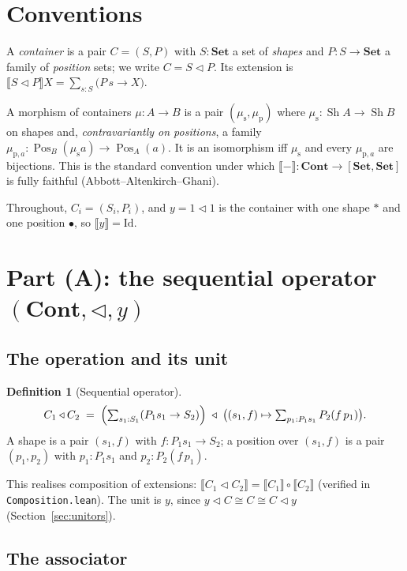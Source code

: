 \documentclass[11pt]{article}
\theoremstyle{definition}
\newtheorem{definition}{Definition}
\newcommand{\Set}{\mathbf{Set}}
\newcommand{\Cont}{\mathbf{Cont}}
\newcommand{\ext}[1]{\llbracket #1 \rrbracket}
\newcommand{\tri}{\mathbin{\triangleleft}}
\DeclareMathOperator{\Sh}{Sh}
\DeclareMathOperator{\Pos}{Pos}
\begin{document}
\section{Conventions}

A \emph{container} is a pair $C=(S,P)$ with $S\colon\Set$ a set of \emph{shapes}
and $P\colon S\to\Set$ a family of \emph{position} sets; we write $C=S\tri P$.
Its extension is $\ext{S\tri P}X=\sum_{s:S}\bigl(P\,s\to X\bigr)$.

A morphism of containers $\mu\colon A\to B$ is a pair
$(\mu_{\mathrm s},\mu_{\mathrm p})$ where $\mu_{\mathrm s}\colon\Sh A\to\Sh B$ on
shapes and, \emph{contravariantly on positions}, a family
$\mu_{\mathrm p,a}\colon\Pos_B(\mu_{\mathrm s}a)\to\Pos_A(a)$. It is an
isomorphism iff $\mu_{\mathrm s}$ and every $\mu_{\mathrm p,a}$ are bijections.
This is the standard convention under which
$\ext{-}\colon\Cont\to[\Set,\Set]$ is fully faithful
(Abbott--Altenkirch--Ghani).

Throughout, $C_i=(S_i,P_i)$, and $y=1\tri 1$ is the container with one shape
$\ast$ and one position $\bullet$, so $\ext y=\mathrm{Id}$.

\section{Part (A): the sequential operator $(\Cont,\tri,y)$}

\subsection{The operation and its unit}

\begin{definition}[Sequential operator]\label{def:seq}
\[
  C_1\tri C_2
  \;=\;
  \Bigl(\textstyle\sum_{s_1:S_1}(P_1 s_1\to S_2)\Bigr)
  \;\tri\;
  \bigl((s_1,f)\mapsto \textstyle\sum_{p_1:P_1 s_1}P_2(f\,p_1)\bigr).
\]
A shape is a pair $(s_1,f)$ with $f\colon P_1 s_1\to S_2$; a position over
$(s_1,f)$ is a pair $(p_1,p_2)$ with $p_1:P_1 s_1$ and $p_2:P_2(f\,p_1)$.
\end{definition}

This realises composition of extensions: $\ext{C_1\tri C_2}=\ext{C_1}\circ\ext{C_2}$
(verified in \texttt{Composition.lean}). The unit is $y$, since $y\tri C\cong C\cong C\tri y$
(Section~\ref{sec:unitors}).

\subsection{The associator}\label{sec:assoc}
\end{document}
